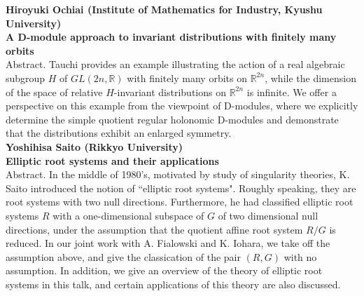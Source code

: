 \documentclass[12pt,landscape]{jarticle}
\begin{document}
\noindent
{\bf\large Hiroyuki Ochiai (Institute of Mathematics for Industry, Kyushu University)} \\ 
{\bf A D-module approach to invariant distributions with finitely many orbits} \\[1mm]
Abstract. 
Tauchi provides an example illustrating the action of a real algebraic subgroup $H$ of $GL(2n,\mathbb{R})$ with finitely many orbits on $\mathbb{R}^{2n}$, 
while the dimension of the space of relative $H$-invariant distributions on $\mathbb{R}^{2n}$ is infinite. We offer a perspective on this example from the viewpoint of D-modules, where we explicitly determine the simple quotient regular holonomic D-modules and demonstrate that the distributions exhibit an enlarged symmetry.
\\[5mm]
{\bf\large Yoshihisa Saito (Rikkyo University)} \\ 
{\bf Elliptic root systems and their applications} \\[1mm]
Abstract. 
In the middle of 1980's, motivated by study of singularity theories, K. Saito
introduced the notion of ``elliptic root systems". Roughly speaking, they are root
systems with two null directions. Furthermore, he had classified elliptic root systems
$R$ with a one-dimensional subspace of $G$ of two dimensional null directions, under the
assumption that the quotient affine root system $R/G$ is reduced. In our joint work
with A. Fialowski and K. Iohara, we take off the assumption above, and give the
classication of the pair $(R, G)$ with no assumption. In addition, we give an overview
of the theory of elliptic root systems in this talk, and certain applications of this theory 
are also discussed.
\end{document}
